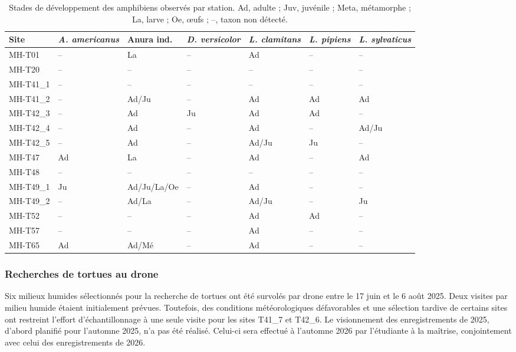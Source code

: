 \begin{table}[H]
\setlength{\tabcolsep}{4pt}
\centering
\caption{Stades de développement des amphibiens observés par station.
Ad, adulte ; Juv, juvénile ; Meta, métamorphe ; La, larve ; Oe, \oe{}ufs ; --, taxon non détecté. }
\label{tab:tab_mh_amphibia}
\begin{tabular}{lllllll}
  \toprule
Site & \emph{A. americanus} & Anura ind. & \emph{D. versicolor} & \emph{L. clamitans} & \emph{L. pipiens} & \emph{L. sylvaticus} \\ 
  \midrule
MH-T01 & -- & La & -- & Ad & -- & -- \\ 
  MH-T20 & -- & -- & -- & -- & -- & -- \\ 
  MH-T41\_1 & -- & -- & -- & -- & -- & -- \\ 
  MH-T41\_2 & -- & Ad/Ju & -- & Ad & Ad & Ad \\ 
  MH-T42\_3 & -- & Ad & Ju & Ad & Ad & -- \\ 
  MH-T42\_4 & -- & Ad & -- & Ad & -- & Ad/Ju \\ 
  MH-T42\_5 & -- & Ad & -- & Ad/Ju & Ju & -- \\ 
  MH-T47 & Ad & La & -- & Ad & -- & Ad \\ 
  MH-T48 & -- & -- & -- & -- & -- & -- \\ 
  MH-T49\_1 & Ju & Ad/Ju/La/Oe & -- & Ad & -- & -- \\ 
  MH-T49\_2 & -- & Ad/La & -- & Ad/Ju & -- & Ju \\ 
  MH-T52 & -- & -- & -- & Ad & Ad & -- \\ 
  MH-T57 & -- & -- & -- & Ad & -- & -- \\ 
  MH-T65 & Ad & Ad/Mé & -- & Ad & -- & -- \\ 
   \bottomrule
\end{tabular}
\end{table}


\subsubsection{Recherches de tortues au drone}

Six milieux humides sélectionnés pour la recherche de tortues ont été survolés par drone entre le 17 juin et le 6 août 2025. Deux visites par milieu humide étaient initialement prévues. Toutefois, des conditions météorologiques défavorables et une sélection tardive de certains sites ont restreint l'effort d'échantillonnage à une seule visite pour les sites T41\_7 et T42\_6. Le visionnement des enregistrements de 2025, d'abord planifié pour l'automne 2025, n'a pas été réalisé. Celui-ci sera effectué à l'automne 2026 par l'étudiante à la maîtrise, conjointement avec celui des enregistrements de 2026.

